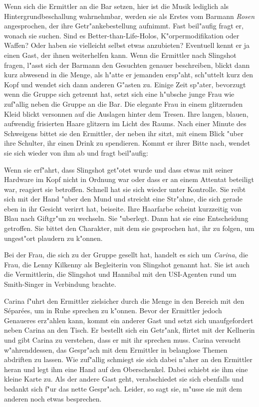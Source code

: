 Wenn sich die Ermittler an die Bar setzen, hier ist die Musik lediglich als Hintergrundbeschallung wahrnehmbar, werden sie als Erstes vom Barmann \emph{Rosen} angesprochen, der ihre Getr"ankebestellung aufnimmt. Fast beil"aufig fragt er, wonach sie suchen. Sind es Better-than-Life-Holos, K"orpermodifikation oder Waffen? Oder haben sie vielleicht selbst etwas anzubieten? Eventuell kennt er ja einen Gast, der ihnen weiterhelfen kann. Wenn die Ermittler nach Slingshot fragen, l"asst sich der Barmann den Gesuchten genauer beschreiben, blickt dann kurz abwesend in die Menge, als h"atte er jemanden ersp"aht, sch"uttelt kurz den Kopf und wendet sich dann anderen G"asten zu. Einige Zeit sp"ater, bevorzugt wenn die Gruppe sich getrennt hat, setzt sich eine h"ubsche junge Frau wie zuf"allig neben die Gruppe an die Bar. Die elegante Frau in einem glitzernden Kleid blickt versonnen auf die Auslagen hinter dem Tresen. Ihre langen, blauen, aufwendig frisierten Haare glitzern im Licht des Raums. Nach einer Minute des Schweigens bittet sie den Ermittler, der neben ihr sitzt, mit einem Blick "uber ihre Schulter, ihr einen Drink zu spendieren. Kommt er ihrer Bitte nach, wendet sie sich wieder von ihm ab und fragt beil"aufig:


Wenn sie erf"ahrt, dass Slingshot get"otet wurde und dass etwas mit seiner Hardware im Kopf nicht in Ordnung war oder dass er an einem Attentat beteiligt war, reagiert sie betroffen. Schnell hat sie sich wieder unter Kontrolle. Sie reibt sich mit der Hand "uber den Mund und streicht eine Str"ahne, die sich gerade eben in ihr Gesicht verirrt hat, beiseite. Ihre Haarfarbe scheint kurzzeitig von Blau nach Giftgr"un zu wechseln. Sie "uberlegt. Dann hat sie eine Entscheidung getroffen. Sie bittet den Charakter, mit dem sie gesprochen hat, ihr zu folgen, um ungest"ort plaudern zu k"onnen.

Bei der Frau, die sich zu der Gruppe gesellt hat, handelt es sich um \emph{Carina}, die Frau, die Lenny Kilkenny als Begleiterin von Slingshot genannt hat. Sie ist auch die Vermittlerin, die Slingshot und Hannibal mit den USI-Agenten rund um Smith-Singer in Verbindung brachte.

Carina f"uhrt den Ermittler zielsicher durch die Menge in den Bereich mit den S\'epar\'ees, um in Ruhe sprechen zu k"onnen. Bevor der Ermittler jedoch Genaueres erz"ahlen kann, kommt ein anderer Gast und setzt sich unaufgefordert neben Carina an den Tisch. Er bestellt sich ein Getr"ank, flirtet mit der Kellnerin und gibt Carina zu verstehen, dass er mit ihr sprechen muss. Carina versucht w"ahrenddessen, das Gespr"ach mit dem Ermittler in belanglose Themen abdriften zu lassen. Wie zuf"allig schmiegt sie sich dabei n"aher an den Ermittler heran und legt ihm eine Hand auf den Oberschenkel. Dabei schiebt sie ihm eine kleine Karte zu. Als der andere Gast geht, verabschiedet sie sich ebenfalls und bedankt sich f"ur das nette Gespr"ach. Leider, so sagt sie, m"usse sie mit dem anderen noch etwas besprechen.

